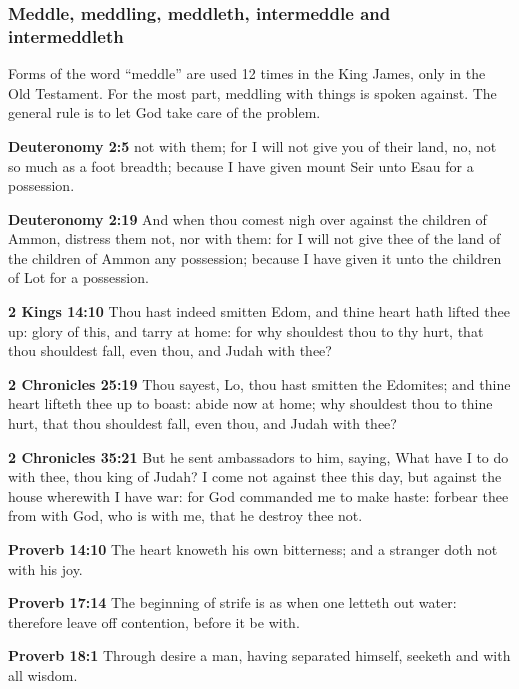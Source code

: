 \subsubsection{Meddle, meddling,  meddleth, intermeddle and intermeddleth}

Forms of the word ``meddle'' are used 12 times in the King James, only in the Old Testament.  For the most part, meddling with things is spoken against. The general rule is to let God take care of the problem.

\begin{compactenum}[1.][10]
	\item  \textbf{Deuteronomy 2:5}  not with them; for I will not give you of their land, no, not so much as a foot breadth; because I have given mount Seir unto Esau for a possession.
	\item \textbf{Deuteronomy 2:19} And when thou comest nigh over against the children of Ammon, distress them not, nor  with them: for I will not give thee of the land of the children of Ammon any possession; because I have given it unto the children of Lot for a possession.
	\item \textbf{2 Kings 14:10} Thou hast indeed smitten Edom, and thine heart hath lifted thee up: glory of this, and tarry at home: for why shouldest thou  to thy hurt, that thou shouldest fall, even thou, and Judah with thee?
	\item \textbf{2 Chronicles 25:19} Thou sayest, Lo, thou hast smitten the Edomites; and thine heart lifteth thee up to boast: abide now at home; why shouldest thou  to thine hurt, that thou shouldest fall, even thou, and Judah with thee?
	\item \textbf{2 Chronicles 35:21} But he sent ambassadors to him, saying, What have I to do with thee, thou king of Judah? I come not against thee this day, but against the house wherewith I have war: for God commanded me to make haste: forbear thee from  with God, who is with me, that he destroy thee not.
	\item \textbf{Proverb 14:10} The heart knoweth his own bitterness; and a stranger doth not  with his joy.
	\item \textbf{Proverb 17:14} The beginning of strife is as when one letteth out water: therefore leave off contention, before it be  with.
	\item \textbf{Proverb 18:1} Through desire a man, having separated himself, seeketh and  with all wisdom.

\end{compactenum}
